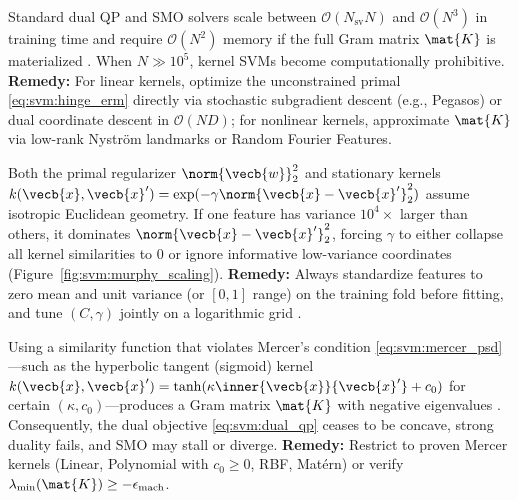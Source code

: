 \documentclass[../../../../master.tex]{subfiles}
\begin{document}
\begin{pitfall}
Standard dual QP and SMO solvers scale between $\mathcal{O}(N_{\mathrm{sv}} N)$ and $\mathcal{O}(N^3)$ in training time and require $\mathcal{O}(N^2)$ memory if the full Gram matrix $\mat{K}$ is materialized  . When $N \gg 10^5$, kernel SVMs become computationally prohibitive. \textbf{Remedy:} For linear kernels, optimize the unconstrained primal \eqref{eq:svm:hinge_erm} directly via stochastic subgradient descent (e.g., Pegasos) or dual coordinate descent in $\mathcal{O}(ND)$; for nonlinear kernels, approximate $\mat{K}$ via low-rank Nystr\"om landmarks or Random Fourier Features.
\end{pitfall}

\begin{pitfall}
Both the primal regularizer $\norm{\vecb{w}}_2^2$ and stationary kernels $k(\vecb{x}, \vecb{x}') = \exp(-\gamma \norm{\vecb{x} - \vecb{x}'}_2^2)$ assume isotropic Euclidean geometry. If one feature has variance $10^4\times$ larger than others, it dominates $\norm{\vecb{x} - \vecb{x}'}_2^2$, forcing $\gamma$ to either collapse all kernel similarities to $0$ or ignore informative low-variance coordinates (Figure~\ref{fig:svm:murphy_scaling}). \textbf{Remedy:} Always standardize features to zero mean and unit variance (or $[0, 1]$ range) on the training fold before fitting, and tune $(C, \gamma)$ jointly on a logarithmic grid .
\end{pitfall}

\begin{pitfall}
Using a similarity function that violates Mercer's condition \eqref{eq:svm:mercer_psd}---such as the hyperbolic tangent (sigmoid) kernel $k(\vecb{x}, \vecb{x}') = \tanh(\kappa \inner{\vecb{x}}{\vecb{x}'} + c_0)$ for certain $(\kappa, c_0)$---produces a Gram matrix $\mat{K}$ with negative eigenvalues . Consequently, the dual objective \eqref{eq:svm:dual_qp} ceases to be concave, strong duality fails, and SMO may stall or diverge. \textbf{Remedy:} Restrict to proven Mercer kernels (Linear, Polynomial with $c_0 \ge 0$, RBF, Mat\'ern) or verify $\lambda_{\min}(\mat{K}) \ge -\epsilon_{\mathrm{mach}}$.
\end{pitfall}
\end{document}
